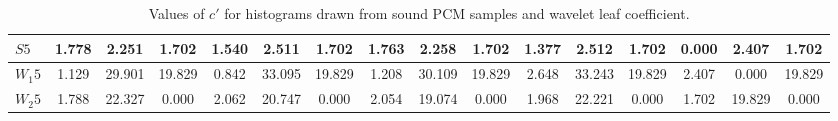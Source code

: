 \begin{table*}[h!]
\begin{center}
\begin{tabular}{| l | c | c | c | c | c | c | c | c | c | c | c | c | c | c | c |}
$S5$ & 1.778  & 2.251  & 1.702  & 1.540  & 2.511  & 1.702  & 1.763  & 2.258  & 1.702  & 1.377  & 2.512  & 1.702  & 0.000  & 2.407  & 1.702 \\\hline
$W_1 5$ & 1.129  & 29.901  & 19.829  & 0.842  & 33.095  & 19.829  & 1.208  & 30.109  & 19.829  & 2.648  & 33.243  & 19.829  & 2.407  & 0.000  & 19.829 \\\hline
$W_2 5$ & 1.788  & 22.327  & 0.000  & 2.062  & 20.747  & 0.000  & 2.054  & 19.074  & 0.000  & 1.968  & 22.221  & 0.000  & 1.702  & 19.829  & 0.000 \\\hline
\end{tabular}
\caption{Values of $c'$ for histograms drawn from sound PCM samples and wavelet leaf coefficient.}
\end{center}
\end{table*}